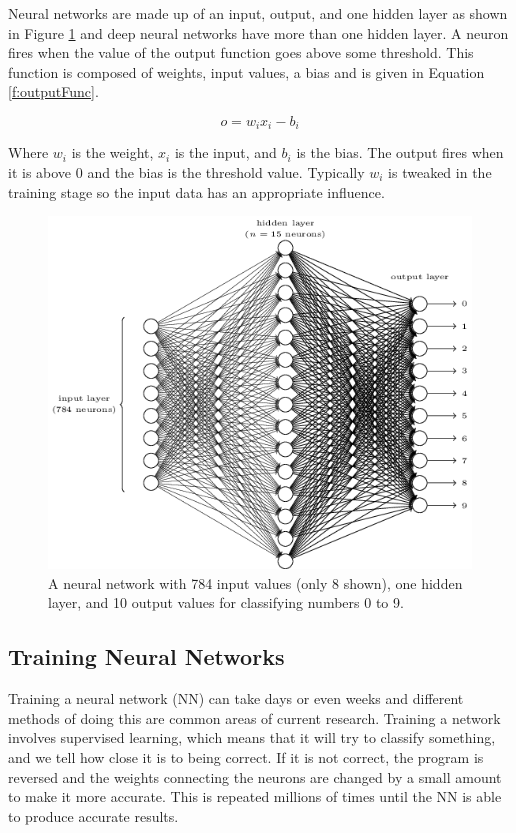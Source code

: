 \documentclass{bhamthesis}
\theoremstyle{definition}
\begin{document}
Neural networks are made up of an input, output, and one hidden layer as shown in Figure \ref{f:NN} and deep neural networks have more than one hidden layer. A neuron fires when the value of the output function goes above some threshold. This function is composed of weights, input values, a bias and is given in Equation \ref{f:outputFunc}.

\begin{equation}\label{f:outputFunc}
o = w_ix_i - b_i
\end{equation}

Where $w_i$ is the weight, $x_i$ is the input, and $b_i$ is the bias. The output fires when it is above $0$ and the bias is the threshold value. Typically $w_i$ is tweaked in the training stage so the input data has an appropriate influence.


\begin{figure}
	\includegraphics[width=\textwidth]{media/img/nnArch2}
	\caption{A neural network with 784 input values (only 8 shown), one hidden layer, and 10 output values for classifying numbers 0 to 9. \cite{Neilsen2015}}\label{f:NN}
\end{figure}


\subsection{Training Neural Networks}\label{s:nnTrainLit}
Training a neural network (NN) can take days or even weeks and different methods of doing this are common areas of current research. Training a network involves supervised learning, which means that it will try to classify something, and we tell how close it is to being correct. If it is not correct, the program is reversed and the weights connecting the neurons are changed by a small amount to make it more accurate. This is repeated millions of times until the NN is able to produce accurate results.
\end{document}
